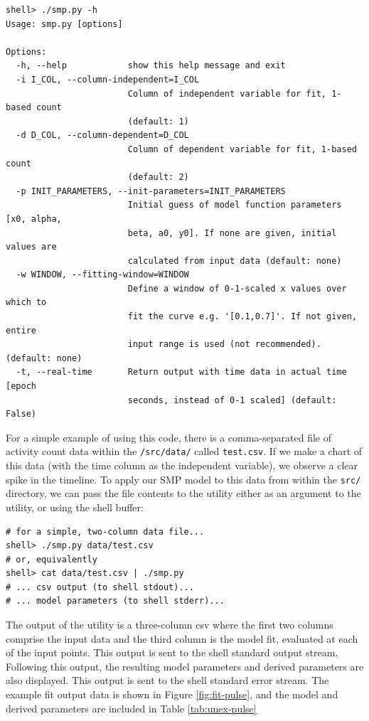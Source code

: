 \documentclass{article}
\begin{document}
\begin{verbatim}
shell> ./smp.py -h
Usage: smp.py [options]

Options:
  -h, --help            show this help message and exit
  -i I_COL, --column-independent=I_COL
                        Column of independent variable for fit, 1-based count
                        (default: 1)
  -d D_COL, --column-dependent=D_COL
                        Column of dependent variable for fit, 1-based count
                        (default: 2)
  -p INIT_PARAMETERS, --init-parameters=INIT_PARAMETERS
                        Initial guess of model function parameters [x0, alpha,
                        beta, a0, y0]. If none are given, initial values are
                        calculated from input data (default: none)
  -w WINDOW, --fitting-window=WINDOW
                        Define a window of 0-1-scaled x values over which to
                        fit the curve e.g. '[0.1,0.7]'. If not given, entire
                        input range is used (not recommended). (default: none)
  -t, --real-time       Return output with time data in actual time [epoch
                        seconds, instead of 0-1 scaled] (default: False) 
\end{verbatim}

For a simple example of using this code, there is a comma-separated file of activity count data within the \texttt{/src/data/} called \texttt{test.csv}. If we make a chart of this data (with the time column as the independent variable), we observe a clear spike in the timeline. To apply our SMP model to this data from within the \texttt{src/} directory, we can pass the file contents to the utility either as an argument to the utility, or using the shell buffer: 

\begin{verbatim}
# for a simple, two-column data file... 
shell> ./smp.py data/test.csv 
# or, equivalently
shell> cat data/test.csv | ./smp.py 
# ... csv output (to shell stdout)...
# ... model parameters (to shell stderr)...
\end{verbatim}

The output of the utility is a three-column csv where the first two columns comprise the input data and the third column is the model fit, evaluated at each of the input points. This output is sent to the shell standard output stream. Following this output, the resulting model parameters and derived parameters are also displayed. This output is sent to the shell standard error stream. The example fit output data is shown in Figure \ref{fig:fit-pulse}, and the model and derived parameters are included in Table \ref{tab:unex-pulse}
\end{document}
